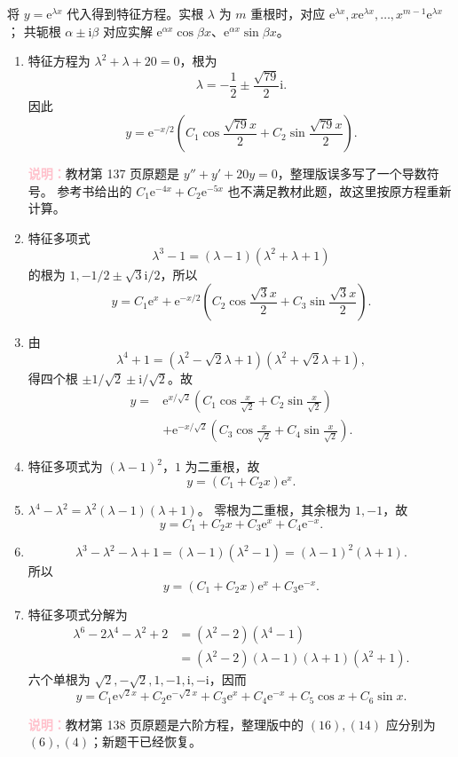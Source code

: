 \documentclass[UTF8,a4paper,11pt]{ctexart}
\newcommand{\e}{\mathrm e}
\newcommand{\note}[1]{\par\smallskip\noindent\textcolor{pink}{\bfseries 说明：}#1\par\smallskip}
\begin{document}
\begin{solution}
将 $y=\e^{\lambda x}$ 代入得到特征方程。实根 $\lambda$ 为 $m$ 重根时，对应
$\e^{\lambda x},x\e^{\lambda x},\ldots,x^{m-1}\e^{\lambda x}$；
共轭根 $\alpha\pm\mathrm i\beta$ 对应实解 $\e^{\alpha x}\cos\beta x$、$\e^{\alpha x}\sin\beta x$。
\begin{enumerate}[label=(\arabic*)]
\item 特征方程为 $\lambda^2+\lambda+20=0$，根为
\[
\lambda=-\frac12\pm\frac{\sqrt{79}}2\mathrm i.
\]
因此
\[
\boxed{y=\e^{-x/2}\left(C_1\cos\frac{\sqrt{79}x}{2}
+C_2\sin\frac{\sqrt{79}x}{2}\right).}
\]
\note{教材第 137 页原题是 $y''+y'+20y=0$，整理版误多写了一个导数符号。
参考书给出的 $C_1\e^{-4x}+C_2\e^{-5x}$ 也不满足教材此题，故这里按原方程重新计算。}

\item 特征多项式
\[
\lambda^3-1=(\lambda-1)(\lambda^2+\lambda+1)
\]
的根为 $1,-1/2\pm\sqrt3\mathrm i/2$，所以
\[
\boxed{y=C_1\e^x+\e^{-x/2}
\left(C_2\cos\frac{\sqrt3x}{2}+C_3\sin\frac{\sqrt3x}{2}\right).}
\]

\item 由
\[
\lambda^4+1=(\lambda^2-\sqrt2\lambda+1)(\lambda^2+\sqrt2\lambda+1),
\]
得四个根 $\pm1/\sqrt2\pm\mathrm i/\sqrt2$。故
\[
\boxed{\begin{aligned}
y={}&\e^{x/\sqrt2}\left(C_1\cos\frac{x}{\sqrt2}+C_2\sin\frac{x}{\sqrt2}\right)\\
&+\e^{-x/\sqrt2}\left(C_3\cos\frac{x}{\sqrt2}+C_4\sin\frac{x}{\sqrt2}\right).
\end{aligned}}
\]

\item 特征多项式为 $(\lambda-1)^2$，$1$ 为二重根，故
\[
\boxed{y=(C_1+C_2x)\e^x.}
\]

\item $\lambda^4-\lambda^2=\lambda^2(\lambda-1)(\lambda+1)$。
零根为二重根，其余根为 $1,-1$，故
\[
\boxed{y=C_1+C_2x+C_3\e^x+C_4\e^{-x}.}
\]

\item
\[
\lambda^3-\lambda^2-\lambda+1
=(\lambda-1)(\lambda^2-1)=(\lambda-1)^2(\lambda+1).
\]
所以
\[
\boxed{y=(C_1+C_2x)\e^x+C_3\e^{-x}.}
\]

\item 特征多项式分解为
\[
\begin{aligned}
\lambda^6-2\lambda^4-\lambda^2+2
&=(\lambda^2-2)(\lambda^4-1)\\
&=(\lambda^2-2)(\lambda-1)(\lambda+1)(\lambda^2+1).
\end{aligned}
\]
六个单根为 $\sqrt2,-\sqrt2,1,-1,\mathrm i,-\mathrm i$，因而
\[
\boxed{y=C_1\e^{\sqrt2x}+C_2\e^{-\sqrt2x}
+C_3\e^x+C_4\e^{-x}+C_5\cos x+C_6\sin x.}
\]
\note{教材第 138 页原题是六阶方程，整理版中的 $(16),(14)$ 应分别为 $(6),(4)$；新题干已经恢复。}
\end{enumerate}
\end{solution}
\end{document}
